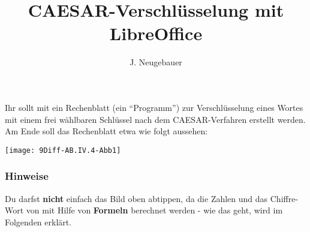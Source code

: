 \documentclass[10pt, a4paper]{scrartcl}
\author{J. Neugebauer}
\title{CAESAR-Verschlüsselung mit LibreOffice}
\date{\Heute}
\begin{document}
\ReiheTitel

\begin{aufgabe}
	Ihr sollt mit  ein Rechenblatt (ein \enquote{Programm}) zur Verschlüsselung eines Wortes mit einem frei wählbaren Schlüssel nach dem CAESAR-Verfahren erstellt werden. Am Ende soll das Rechenblatt etwa wie folgt aussehen:
	
	\begin{center}
	\texttt{[image: 9Diff-AB.IV.4-Abb1]}
	\end{center}
\end{aufgabe}

\subsubsection*{Hinweise}
Du darfst \textbf{nicht} einfach das Bild oben abtippen, da die Zahlen und das Chiffre-Wort von  mit Hilfe von \textbf{Formeln} berechnet werden - wie das geht, wird im Folgenden erklärt.
\end{document}
